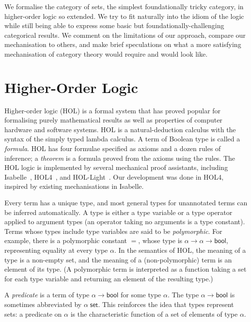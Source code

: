 \documentclass[twoside,titlepage,11pt]{article}
\begin{document}
We formalise the category of sets, the simplest foundationally tricky category, in higher-order logic so extended.
We try to fit naturally into the idiom of the logic while still being able to express some basic but foundationally-challenging categorical results.
We comment on the limitations of our approach, compare our mechanisation to others, and make brief speculations on what a more satisfying mechanisation of category theory would require and would look like.
\section{Higher-Order Logic}%
\newcommand{\bool}{\ensuremath{\mathsf{bool}}}
Higher-order logic (HOL) is a formal system that has proved popular for formalising purely mathematical results as well as properties of computer hardware and software systems.
HOL is a natural-deduction calculus with the syntax of the simply typed lambda calculus.
A term of Boolean type is called a \emph{formula}.
HOL has four formulae specified as axioms and a dozen rules of inference; a \emph{theorem} is a formula proved from the axioms using the rules.
The HOL logic is implemented by several mechanical proof assistants, including Isabelle~\cite{DBLP:conf/tphol/WenzelPN08}, HOL4~\cite{DBLP:conf/tphol/SlindN08}, and HOL-Light~\cite{DBLP:conf/tphol/Harrison09a}.
Our development was done in HOL4, inspired by existing mechanisations \cite{Katovsky,DBLP:journals/entcs/OKeefe04} in Isabelle.

Every term has a unique type, and most general types for unannotated terms can be inferred automatically.
A type is either a type variable or a type operator applied to argument types (an operator taking no arguments is a type constant).
Terms whose types include type variables are said to be \emph{polymorphic}.
For example, there is a polymorphic constant $=$, whose type is $\alpha\to\alpha\to\bool$, representing equality at every type $\alpha$.
In the semantics of HOL, the meaning of a type is a non-empty set, and the meaning of a (non-polymorphic) term is an element of its type.
(A polymorphic term is interpreted as a function taking a set for each type variable and returning an element of the resulting type.)

A \emph{predicate} is a term of type $\alpha\to\bool$ for some type $\alpha$.
The type $\alpha\to\bool$ is sometimes abbreviated by $\alpha\;\mathsf{set}$.
This reinforces the idea that types represent sets: a predicate on $\alpha$ is the characteristic function of a set of elements of type $\alpha$.
\end{document}
